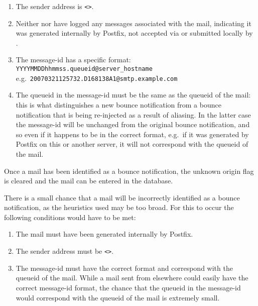 \begin{enumerate}

    \item The sender address is \verb!<>!.\glsadd{<>}

    \item Neither  nor  have logged any
        messages associated with the mail, indicating it was generated
        internally by Postfix, not accepted via  or submitted
        locally by .

    \item The message-id has a specific format: \newline{}
        \tab{} \texttt{YYYYMMDDhhmmss.queueid@server\_hostname} \newline{}
        e.g.\ \texttt{20070321125732.D168138A1@smtp.example.com}

    \item The queueid in the message-id must be the same as the queueid of
        the mail: this is what distinguishes a new bounce notification from
        a bounce notification that is being re-injected as a result of
        aliasing.  In the latter case the message-id will be unchanged from
        the original bounce notification, and so even if it happens to be
        in the correct format, e.g.\ if it was generated by Postfix on this
        or another server, it will not correspond with the queueid of the
        mail.

\end{enumerate}

Once a mail has been identified as a bounce notification, the unknown
origin flag is cleared and the mail can be entered in the database.

There is a small chance that a mail will be incorrectly identified as a
bounce notification, as the heuristics used may be too broad.  For this to
occur the following conditions would have to be met:

\begin{enumerate}

    \item The mail must have been generated internally by Postfix.

    \item The sender address must be \verb!<>!.\glsadd{<>}

    \item The message-id must have the correct format and correspond with
        the queueid of the mail.  While a mail sent from elsewhere could
        easily have the correct message-id format, the chance that the
        queueid in the message-id would correspond with the queueid of the
        mail is extremely small.

\end{enumerate}

